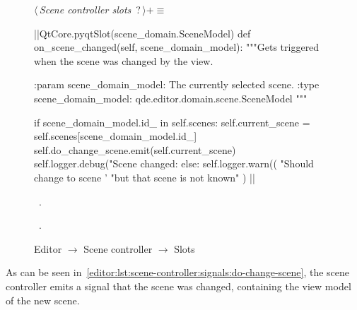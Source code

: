 \documentclass[%
    a4paper,    %
    justified,  %
    nobib,      %
    openany     %
]{tufte-book}
\makeatletter
\renewcommand{\label}[1]{\@tufte@label{##1}}%
\makeatother
\begin{document}
\begin{figure}
\begin{flushleft} \small
\begin{minipage}{\linewidth}\label{scrap95}\raggedright\small
{} $\langle\,${\itshape Scene controller slots}\nobreak\ {\footnotesize {?}}$\,\rangle+\equiv$
\vspace{-1ex}
\begin{pythoncode}
|\normalfont{}\fontfamily{}|QtCore.pyqtSlot(scene_domain.SceneModel)
def on_scene_changed(self, scene_domain_model):
    """Gets triggered when the scene was changed by the view.

    :param scene_domain_model: The currently selected scene.
    :type  scene_domain_model: qde.editor.domain.scene.SceneModel
    """

    if scene_domain_model.id_ in self.scenes:
        self.current_scene = self.scenes[scene_domain_model.id_]
        self.do_change_scene.emit(self.current_scene)
        self.logger.debug("Scene changed: %
    else:
        self.logger.warn((
            "Should change to scene '%
            "but that scene is not known"
        ) %
|\NWsep|
\end{pythoncode}
\vspace{1.5ex}
\footnotesize
\begin{list}{}{\setlength{\itemsep}{-\parsep}\setlength{\itemindent}{-\leftmargin}}
\item \NWtxtMacroDefBy\ .
\item \NWtxtMacroRefIn\ .

\item{}
\end{list}
\end{minipage}\vspace{4ex}
\end{flushleft}
\caption{
  \newline{}\newline{}Editor $\rightarrow$ Scene controller $\rightarrow$
  Slots}
\label{editor:lst:scene-controller:signals:do-change-scene}
\end{figure}

As can be seen in~\autoref{editor:lst:scene-controller:signals:do-change-scene},
the scene controller emits a signal that the scene was changed, containing the
view model of the new scene.
\end{document}
